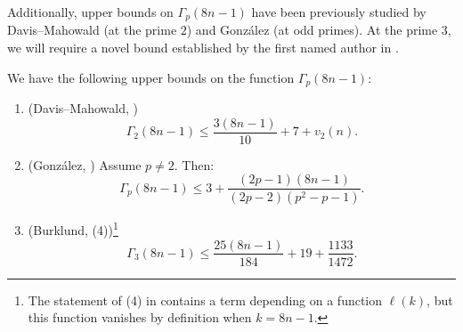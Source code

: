 Additionally, upper bounds on $\Gamma_p (8n-1)$ have been previously studied by Davis--Mahowald \cite{DM3} (at the prime $2$) and Gonz\'alez \cite{Gonzalez} (at odd primes). At the prime $3$, we will require a novel bound established by the first named author in .

\begin{thm} \label{thm:gamma-upper}
  We have the following upper bounds on the function $\Gamma_{p} (8n-1)$:
  \begin{enumerate}
    \item (Davis--Mahowald, \cite[Corollary 1.3]{DM3})
      \[\Gamma_2 (8n-1) \leq \frac{3(8n-1)}{10}+7+v_2 (n). \]
    \item (Gonz\'alez, \cite[Theorem 5.1]{Gonzalez}) Assume $p \neq 2$. Then:
      \[\Gamma_p (8n-1) \leq 3+\frac{(2p-1)(8n-1)}{(2p-2)(p^2-p-1)}. \]
    \item (Burklund,  (4))\footnote{The statement of (4) in  contains a term depending on a function $\ell(k)$, but this function vanishes by definition when $k=8n-1$.}
      \[\Gamma_3 (8n-1) \leq \frac{25(8n-1)}{184}+19+\frac{1133}{1472}.\]
  \end{enumerate}
\end{thm}
%
%
%
%
%
%
